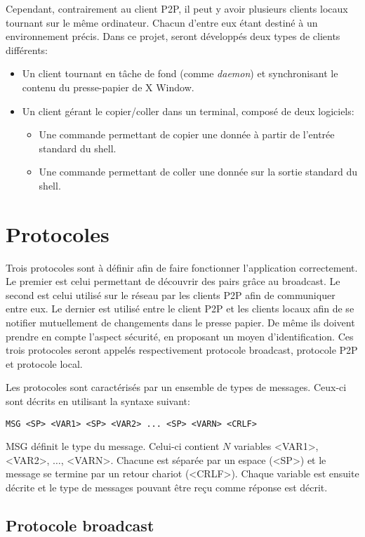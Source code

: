 Cependant, contrairement au client P2P, il peut y avoir plusieurs clients
locaux tournant sur le même ordinateur. Chacun d'entre eux étant destiné
à un environnement précis. Dans ce projet, seront développés deux types
de clients différents:
\begin{itemize}
\item Un client tournant en tâche de fond (comme \emph{daemon}) et
  synchronisant le contenu du presse-papier de X Window.
\item Un client gérant le copier/coller dans un terminal, composé de deux
  logiciels:
  \begin{itemize}
  \item Une commande permettant de copier une donnée à partir de l'entrée
    standard du shell.
  \item Une commande permettant de coller une donnée sur la sortie standard
    du shell.
  \end{itemize}
\end{itemize}

\section{Protocoles}
Trois protocoles sont à définir afin de faire fonctionner l'application
correctement. Le premier est celui permettant de découvrir des pairs grâce au
broadcast. Le second est celui utilisé sur le réseau par les clients
P2P afin de communiquer entre eux. Le dernier est utilisé entre le client
P2P et les clients locaux afin de se notifier mutuellement de changements
dans le presse papier. De même ils doivent prendre en compte
l'aspect sécurité, en proposant un moyen d'identification.
Ces trois protocoles seront appelés respectivement protocole broadcast,
protocole P2P et protocole local.

Les protocoles sont caractérisés par un ensemble de types de messages.
Ceux-ci sont décrits en utilisant la syntaxe suivant:
\begin{verbatim}
MSG <SP> <VAR1> <SP> <VAR2> ... <SP> <VARN> <CRLF>
\end{verbatim}
MSG définit le type du message. Celui-ci contient $N$ variables
<VAR1>, <VAR2>, $\ldots$, <VARN>. Chacune est séparée par un espace (<SP>)
et le message se termine par un retour chariot (<CRLF>). Chaque variable est
ensuite décrite et le type de messages pouvant être reçu comme réponse est
décrit.

\subsection{Protocole broadcast}
